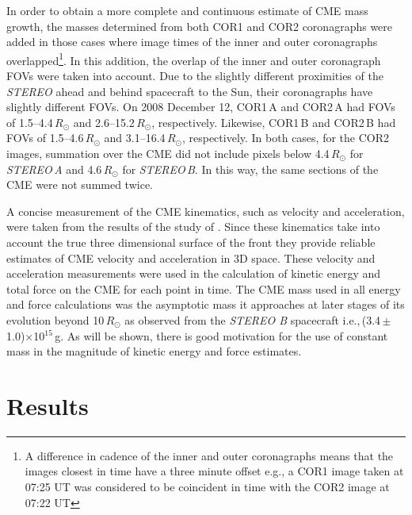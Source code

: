 \documentclass{emulateapj}
\begin{document}
In order to obtain a more complete and continuous estimate of CME mass growth, the masses determined from both COR1 and COR2 coronagraphs were added in those cases where image times of the inner and outer coronagraphs overlapped\footnote{A difference in cadence of the inner and outer coronagraphs means that the images closest in time have a three minute offset e.g., a COR1 image taken at 07:25 UT was considered to be coincident in time with the COR2 image at 07:22 UT}. In this addition, the overlap of the inner and outer coronagraph FOVs were taken into account. Due to the slightly different proximities of the \emph{STEREO} ahead and behind spacecraft to the Sun, their coronagraphs have slightly different FOVs. On 2008 December 12, COR1\,A and COR2\,A had FOVs of 1.5--4.4\,$R_{\odot}$ and 2.6--15.2\,$R_{\odot}$, respectively. Likewise, COR1\,B and COR2\,B had FOVs of 1.5--4.6\,$R_{\odot}$  and 3.1--16.4\,$R_{\odot}$, respectively. In both cases, for the COR2 images, summation over the CME did not include pixels below 4.4\,$R_{\odot}$ for \emph{STEREO\,A} and 4.6\,$R_{\odot}$ for \emph{STEREO\,B}. In this way, the same sections of the CME were not summed twice. 

A concise measurement of the CME kinematics, such as velocity and acceleration, were taken from the results of the study of \citet{byr10}. Since these kinematics take into account the true three dimensional surface of the front they provide reliable estimates of CME velocity and acceleration in 3D space. These velocity and acceleration measurements were used in the calculation of kinetic energy and total force on the CME for each point in time. The CME mass used in all energy and force calculations was the asymptotic mass it approaches at later stages of its evolution beyond 10\,$R_{\odot}$ as observed from the \emph{STEREO B} spacecraft i.e.,\,(3.4\,$\pm$\,1.0)$\times$10$^{15}$\,g. As will be shown, there is good motivation for the use of constant mass in the magnitude of kinetic energy and force estimates. 

\section{Results} \label{bozomath}
\end{document}
